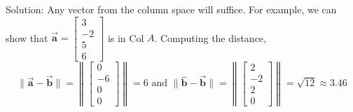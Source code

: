 \documentclass[letter,11pt]{article}
\theoremstyle{definition}
\begin{document}
\begin{tcolorbox}[boxrule=1mm,enhanced jigsaw, breakable,before=\hfill,after=\hfill,adjusted title={Problem 5 solutions}]
Solution: Any vector from the column space will suffice. For example, we can show that $\vec{\boldsymbol{a}}=\begin{bmatrix}3 \\ -2 \\ 5 \\ 6\end{bmatrix}$ is in Col $A$. Computing the distance,
$$
\|\vec{\boldsymbol{a}}-\vec{\boldsymbol{b}}\|=\left\|\begin{bmatrix}
0 \\
-6 \\
0 \\
0
\end{bmatrix}\right\|=6 \text { and }\|\hat{\boldsymbol{b}}-\vec{\boldsymbol{b}}\|=\left\|\begin{bmatrix}
2 \\
-2 \\
2 \\
0
\end{bmatrix}\right\|=\sqrt{12} \approx 3.46
$$
\end{tcolorbox}
\newpage


        
\end{document}
